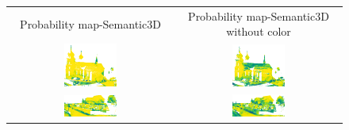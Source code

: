     \begin{figure}[h!]
        \centering
        \begin{tabular}{cc}
            Probability map-Semantic3D & Probability map-Semantic3D without color \\
            \includegraphics[width=0.33\textwidth, height=0.18\textheight]{images/ood_imgs/fout_sem3d/fout_prob_1.png}&
            \includegraphics[width=0.33\textwidth, height=0.18\textheight]{images/sem3d_of/fout_prob_sem3d_of_1.png}\\

            \includegraphics[width=0.33\textwidth, height=0.18\textheight]{images/ood_imgs/fout_sem3d/fout_prob_2.png}&
            \includegraphics[width=0.33\textwidth, height=0.18\textheight]{images/sem3d_of/fout_prob_sem3d_of_2.png}\\


\end{tabular}
\end{figure}
